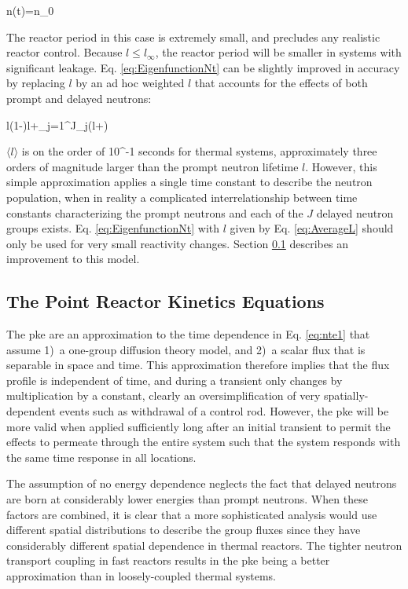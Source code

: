 \beq
\label{eq:EigenfunctionNt}
n(t)=n_0
\eeq

The reactor period in this case is extremely small, and precludes any realistic reactor control. Because \(l\leq l_\infty\), the reactor period will be smaller in systems with significant leakage. Eq. \eqref{eq:EigenfunctionNt} can be slightly improved in accuracy by replacing \(l\) by an ad hoc weighted \(l\) that accounts for the effects of both prompt and delayed neutrons:

\beq
\label{eq:AverageL}
\langle l\rangle\equiv(1-\beta)l+\sum_{j=1}^J\beta_j\left(l+\right)
\eeq

\(\langle l\rangle\) is on the order of 10^{-1} seconds for thermal systems, approximately three orders of magnitude larger than the prompt neutron lifetime \(l\). However, this simple approximation applies a single time constant to describe the neutron population, when in reality a complicated interrelationship between time constants characterizing the prompt neutrons and each of the \(J\) delayed neutron groups exists. Eq. \eqref{eq:EigenfunctionNt} with \(l\) given by Eq. \eqref{eq:AverageL} should only be used for very small reactivity changes. Section \ref{sec:PKE} describes an improvement to this model.

\subsection{The Point Reactor Kinetics Equations}
\label{sec:PKE}

The \gls{pke} are an approximation to the time dependence in Eq. \eqref{eq:nte1} that assume 1)~a one-group diffusion theory model, and 2)~a scalar flux that is separable in space and time. This approximation therefore implies that the flux profile is independent of time, and during a transient only changes by multiplication by a constant, clearly an oversimplification of very spatially-dependent events such as withdrawal of a control rod. However, the \gls{pke} will be more valid when applied sufficiently long after an initial transient to permit the effects to permeate through the entire system such that the system responds with the same time response in all locations.

The assumption of no energy dependence neglects the fact that delayed neutrons are born at considerably lower energies than prompt neutrons. When these factors are combined, it is clear that a more sophisticated analysis would use different spatial distributions to describe the group fluxes since they have considerably different spatial dependence in thermal reactors. The tighter neutron transport coupling in fast reactors results in the \gls{pke} being a better approximation than in loosely-coupled thermal systems.

